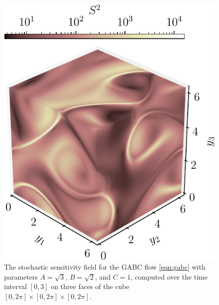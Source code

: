 \begin{figure}
	\centering
	\includegraphics[width=\textwidth]{chp04_paper_numerics/figures/gabc/S2_box_1.7320508075688772_1.4142135623730951_1_cropped}
	\caption{The stochastic sensitivity field for the GABC flow \cref{eqn:gabc} with parameters \(A = \sqrt{3}\), \(B = \sqrt{2}\), and \(C = 1\), computed over the time interval \([0,3]\) on three faces of the cube \([0,2\pi] \times [0,2\pi] \times [0,2\pi]\).}
	\label{fig:gabc_S2}
\end{figure}

